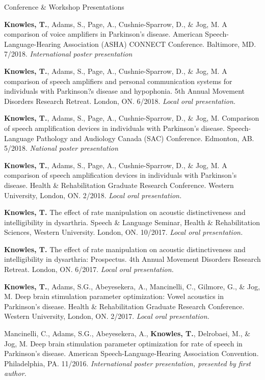 \documentclass{resume} %
\begin{document}
\begin{rSection}{Conference \& Workshop Presentations}
	
	{\bf Knowles, T.}, Adams, S., Page, A., Cushnie-Sparrow, D., \& Jog, M. A comparison of voice amplifiers in Parkinson's disease. American Speech-Language-Hearing Association (ASHA) CONNECT Conference. Baltimore, MD. 7/2018. \emph{International poster presentation}
	
	{\bf Knowles, T.}, Adams, S., Page, A., Cushnie-Sparrow, D., \& Jog, M. A comparison of speech amplifiers and personal communication systems for individuals with Parkinson?s disease and hypophonia. 5th Annual Movement Disorders Research Retreat. London, ON. 6/2018. \emph{Local oral presentation.}

	{\bf Knowles, T.}, Adams, S., Page, A., Cushnie-Sparrow, D., \& Jog, M. Comparison of speech amplification devices in individuals with Parkinson's disease. Speech-Language Pathology and Audiology Canada (SAC) Conference. Edmonton, AB. 5/2018. \emph{National poster presentation} 
	
	{\bf Knowles, T.}, Adams, S., Page, A., Cushnie-Sparrow, D., \& Jog, M. A comparison of speech amplification devices in individuals with Parkinson's disease. Health \& Rehabilitation  Graduate Research Conference. Western University, London, ON. 2/2018. \emph{Local oral presentation.}
	
	{\bf Knowles, T.} The effect of rate manipulation on acoustic distinctiveness and intelligibility in dysarthria. Speech \& Language Seminar, Health \& Rehabilitation Sciences, Western University. London, ON. 10/2017. \emph{Local oral presentation.}
	
	{\bf Knowles, T.} The effect of rate manipulation on acoustic distinctiveness and intelligibility in dysarthria: Prospectus. 4th Annual Movement Disorders Research Retreat. London, ON. 6/2017. \emph{Local oral presentation.}
	
	{\bf Knowles, T.}, Adams, S.G., Abeyesekera, A., Mancinelli, C., Gilmore, G., \& Jog, M. Deep brain stimulation parameter optimization: Vowel acoustics in Parkinson's disease. Health \& Rehabilitation Graduate Research Conference. Western University, London, ON. 2/2017. \emph{Local oral presentation.}
	
	Mancinelli, C., Adams, S.G., Abeyesekera, A., {\bf Knowles, T.}, Delrobaei, M., \& Jog, M. Deep brain stimulation parameter optimization for rate of speech in Parkinson's disease. American Speech-Language-Hearing Association Convention. Philadelphia, PA. 11/2016. \emph{International poster presentation, presented by first author.}
	

\end{rSection}
\end{document}
